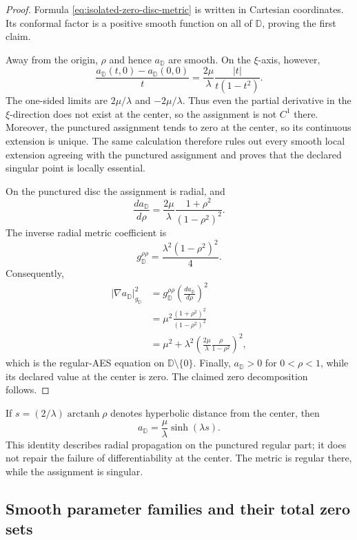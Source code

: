 \begin{proof}
Formula \eqref{eq:isolated-zero-disc-metric} is written in Cartesian
coordinates.  Its conformal factor is a positive smooth function on all of
\(\mathbb D\), proving the first claim.

Away from the origin, \(\rho\) and hence \(a_{\mathbb D}\) are smooth.  On the
\(\xi\)-axis, however,
\[
 \frac{a_{\mathbb D}(t,0)-a_{\mathbb D}(0,0)}{t}
 =\frac{2\mu}{\lambda}
  \frac{|t|}{t(1-t^2)}.
\]
The one-sided limits are \(2\mu/\lambda\) and
\(-2\mu/\lambda\).  Thus even the partial derivative in the \(\xi\)-direction
does not exist at the center, so the assignment is not \(C^1\) there.  Moreover,
the punctured assignment tends to zero at the center, so its continuous extension
is unique.  The same calculation therefore rules out every smooth local extension
agreeing with the punctured assignment and proves that the declared singular point
is locally essential.

On the punctured disc the assignment is radial, and
\[
 \frac{da_{\mathbb D}}{d\rho}
 =\frac{2\mu}{\lambda}
  \frac{1+\rho^2}{(1-\rho^2)^2}.
\]
The inverse radial metric coefficient is
\[
 g_{\mathbb D}^{\rho\rho}
 =\frac{\lambda^2(1-\rho^2)^2}{4}.
\]
Consequently,
\begin{align*}
 |\nabla a_{\mathbb D}|_{g_{\mathbb D}}^2
 &=g_{\mathbb D}^{\rho\rho}
   \left(\frac{da_{\mathbb D}}{d\rho}\right)^2\\
 &=\mu^2\frac{(1+\rho^2)^2}{(1-\rho^2)^2}\\
 &=\mu^2+
   \lambda^2
   \left(\frac{2\mu}{\lambda}
         \frac{\rho}{1-\rho^2}\right)^2,
\end{align*}
which is the regular-AES equation on
\(\mathbb D\setminus\{0\}\).  Finally,
\(a_{\mathbb D}>0\) for \(0<\rho<1\), while its declared value at the
center is zero.  The claimed zero decomposition follows.
\end{proof}

If \(s=(2/\lambda)\operatorname{arctanh}\rho\) denotes hyperbolic distance
from the center, then
\[
 a_{\mathbb D}=\frac{\mu}{\lambda}\sinh(\lambda s).
\]
This identity describes radial propagation on the punctured regular part; it
does not repair the failure of differentiability at the center.  The metric is
regular there, while the assignment is singular.

\subsection{Smooth parameter families and their total zero sets}

